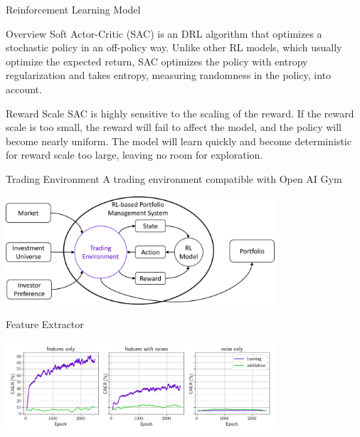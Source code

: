 \begin{frame}{Reinforcement Learning Model}
\begin{block}{Overview}
Soft Actor-Critic (SAC) is an DRL algorithm that optimizes a stochastic policy in an off-policy way.
Unlike other RL models, which usually optimize the expected return, SAC optimizes the policy with entropy regularization and takes entropy, measuring randomness in the policy, into account.
\end{block}
\begin{block}{Reward Scale}
SAC is highly sensitive to the scaling of the reward. If the reward scale is too small, the reward will fail to affect the model, and the policy will become nearly uniform. The model will learn quickly and become deterministic for reward scale too large, leaving no room for exploration.
\end{block}
\end{frame}



\begin{frame}{Trading Environment}
A trading environment compatible with Open AI Gym
\begin{center}
  \includegraphics[width=10cm]{images/trading_environment.png}
\end{center}
\end{frame}

\begin{frame}{Feature Extractor}
\begin{center}
  \includegraphics[width=10cm]{images/compare_noise.png}
\end{center}
\end{frame}

